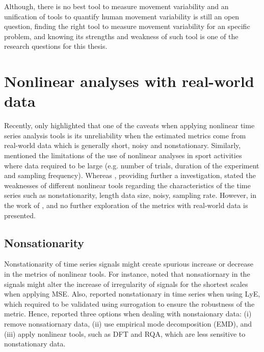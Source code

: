 Although, there is no best tool to measure movement variability and an 
unification of tools to quantify human movement variability is still an 
open question, finding the right tool to measure movement variability 
for an specific problem, and knowing its strengths and weakness of such 
tool is one of the research questions for this thesis. 


\section{Nonlinear analyses with real-world data} \label{nonlieaRealdata} 
Recently, \cite{huffaker2017} only highlighted that one of the caveats 
when applying nonlinear time series analysis tools is its unreliability 
when the estimated metrics come from real-world data which is generally 
short, noisy and nonstationary. Similarly, \cite{preatoni2013} mentioned 
the limitations of the use of nonlinear analyses in sport activities 
where data required to be large (e.g. number of trials, duration of the 
experiment and sampling frequency). Whereas \cite{caballero2014}, 
providing further a investigation, stated the weaknesses of different 
nonlinear tools regarding the characteristics of the time series such 
as nonstationarity, length data size, noisy, sampling rate.
However, in the work of \cite{huffaker2017}, \cite{preatoni2013} and
\cite{caballero2014} no further exploration of the metrics with 
real-world data is presented.



%


\subsection{Nonsationarity}
Nonstationarity of time series signals might create
spurious increase or decrease in the metrics of nonlinear tools. 
For instance, \cite{costa2007} noted that nonsatiornary in the signals might 
alter the increase of irregularity of signals for the shortest scales when 
applying MSE.  Also, \cite{dingwell2000} reported nonstationary in time series 
when using LyE, which required to be validated using surrogation 
to ensure the robustness of the metric. 
Hence, \cite{caballero2014} reported three options when dealing with 
nonstaionary data: (i) remove nonsatiornary data, (ii) use empirical mode 
decomposition (EMD), and (iii) apply nonlinear tools, such as DFT and RQA, 
which are less sensitive to nonstationary data.

